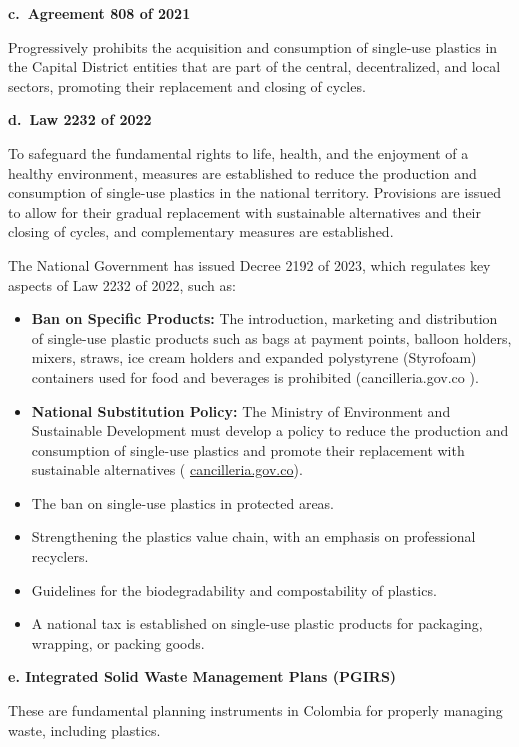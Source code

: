 \documentclass[
  12pt,
  oneside]{book}
\providecommand{\tightlist}{%
  \setlength{\itemsep}{0pt}\setlength{\parskip}{0pt}}
\begin{document}
\textbf{c.~Agreement 808 of 2021 }

Progressively prohibits the acquisition and consumption of single-use
plastics in the Capital District entities that are part of the central,
decentralized, and local sectors, promoting their replacement and
closing of cycles.

\textbf{d.~Law 2232 of 2022 }

To safeguard the fundamental rights to life, health, and the enjoyment
of a healthy environment, measures are established to reduce the
production and consumption of single-use plastics in the national
territory. Provisions are issued to allow for their gradual replacement
with sustainable alternatives and their closing of cycles, and
complementary measures are established.

The National Government has issued Decree 2192 of 2023, which regulates
key aspects of Law 2232 of 2022, such as:

\begin{itemize}
\tightlist
\item
  \textbf{Ban on Specific Products: }The introduction, marketing and
  distribution of single-use plastic products such as bags at payment
  points, balloon holders, mixers, straws, ice cream holders and
  expanded polystyrene (Styrofoam) containers used for food and
  beverages is prohibited (cancilleria.gov.co {).}
\item
  \textbf{National Substitution Policy: }The Ministry of Environment and
  Sustainable Development must develop a policy to reduce the production
  and consumption of single-use plastics and promote their replacement
  with sustainable alternatives (
  \href{https://www.cancilleria.gov.co/sites/default/files/Normograma/docs/pdf/ley_2232_2022.pdf?utm_source=chatgpt.com}{cancilleria.gov.co}{).}
\item
  The ban on single-use plastics in protected areas.
\item
  Strengthening the plastics value chain, with an emphasis on
  professional recyclers.
\item
  Guidelines for the biodegradability and compostability of plastics.
\item
  A national tax is established on single-use plastic products for
  packaging, wrapping, or packing goods.
\end{itemize}

\textbf{e. Integrated Solid Waste Management Plans (PGIRS) }

These are fundamental planning instruments in Colombia for properly
managing waste, including plastics.
\end{document}
